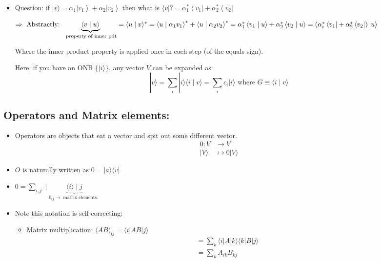 \documentclass{article}
\begin{document}
\begin{itemize}
\item Question: if $|v\rangle=\alpha_{1}\left|v_{1}\right\rangle+\alpha_{2}\left|v_{2}\right\rangle$ then what is $\langle v| ? =\alpha_{1}^{*}\left\langle v_{1}\right|+\alpha_{2}^{*}\left\langle v_{2}\right|$

$\Rightarrow \text { Abstractly: }\underbrace{\langle v \mid u\rangle}_{\text { property of inner pdt}} =\langle u \mid v\rangle^{*}=\left\langle u \mid \alpha_{1} v_{1}\right\rangle^{*}+\left\langle u \mid \alpha_{2} v_{2}\right\rangle^{*}=\alpha_{1}^{*}\left\langle v_{1} \mid u\right\rangle+\alpha_{2}^* \left\langle v_{2} \mid u\right\rangle = \left( \alpha_i^* \bra{v_1} + \alpha_2^* \bra{v_2} \right) \ket{u}$

Where the inner product property is applied once in each step (of the equals sign). 

Here, if you have an ONB $\{|i\rangle\}$, any vector $V$ can be expanded as:
$$
|v\rangle=\sum_{i}|i\rangle\langle i \mid v\rangle=\sum_{i} c_{i}|i\rangle \text { where } G \equiv\langle i \mid v\rangle
$$

\end{itemize}


\subsection{Operators and Matrix elements:}
\begin{itemize}
    \item Operators are objects that eat a vector and spit out some different vector.
$$
\begin{aligned}
0: V & \rightarrow V \\
|V\rangle & \mapsto 0|V\rangle
\end{aligned}
$$
\item $O$ is naturally written as $0=|a\rangle\langle v|$
\item  $0=\sum_{i, j} \mid \underbrace{\langle i\rangle \mid j}_{0_{i j} \rightarrow \text { matrix elements. }}$
\item Note this notation is self-correcting: 

\begin{itemize}
    \item Matrix multiplication: $\langle A B)_{i j}=\langle i|A B| j\rangle$
$$
\begin{aligned}
&=\sum_{k}\langle i|A| k\rangle\langle k|B| j\rangle \\
&=\sum_{k} A_{i k} B_{k j}
\end{aligned}
$$
\end{itemize} 
\end{itemize}
\end{document}
